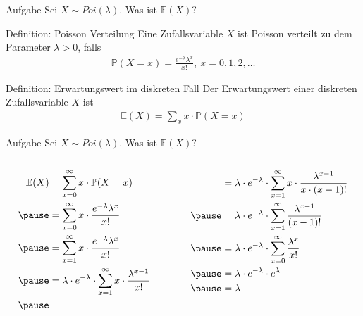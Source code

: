 \documentclass[t,11pt,aspectratio=169]{beamer}
\begin{document}
\begin{frame}
	\begin{block}{Aufgabe}
	Sei $X\sim Poi(\lambda)$. Was ist $\mathbb{E}(X)$?
	\end{block}
	\pause
	\begin{alertblock}{Definition: Poisson Verteilung}
	Eine Zufallsvariable $X$ ist Poisson verteilt zu dem Parameter $\lambda>0$, falls
	\begin{align*}
	\mathbb{P}(X=x)=\frac{e^{-\lambda}\lambda^x}{x!},~x=0,1,2,\dots
	\end{align*}
	\end{alertblock}
	\pause
	\begin{alertblock}{Definition: Erwartungswert im diskreten Fall}
	Der Erwartungswert einer diskreten Zufallsvariable $X$ ist 
	\begin{align*}
	\mathbb{E}(X)=\sum_{x}x\cdot \mathbb{P}(X=x)
	\end{align*}
	\end{alertblock}
\end{frame}

\begin{frame}
	\begin{block}{Aufgabe}
	Sei $X\sim Poi(\lambda)$. Was ist $\mathbb{E}(X)$?
	\end{block}
	\begin{columns}[T] %
	\begin{column}{.48\textwidth}
	\begin{align*}
	\mathbb{E}(X)	 &= \sum_{x=0}^{\infty}x\cdot \mathbb{P}(X=x) \\ \pause
	&= \sum_{x=0}^{\infty}x\cdot \frac{e^{-\lambda}\lambda^x}{x!} \\ \pause
	&= \sum_{x=1}^{\infty}x\cdot \frac{e^{-\lambda}\lambda^x}{x!} \\ \pause
	&= \lambda\cdot e^{-\lambda}\cdot\sum_{x=1}^{\infty}x\cdot \frac{\lambda^{x-1}}{x!} \\ \pause
	\end{align*}
	\end{column}
	\vrule
	\begin{column}{.48\textwidth}
	\begin{align*}
	&= \lambda\cdot e^{-\lambda}\cdot\sum_{x=1}^{\infty}x\cdot \frac{\lambda^{x-1}}{x\cdot  (x-1)!} \\ \pause
	&= \lambda\cdot e^{-\lambda}\cdot\sum_{x=1}^{\infty} \frac{\lambda^{x-1}}{(x-1)!} \\ \pause
	&= \lambda\cdot e^{-\lambda}\cdot\sum_{x=0}^{\infty}\frac{\lambda^{x}}{x!} \\ \pause
	&= \lambda\cdot e^{-\lambda}\cdot e^{\lambda}\\ \pause
	&= \lambda
	\end{align*}
	\end{column}
	\end{columns}
\end{frame}
\end{document}
